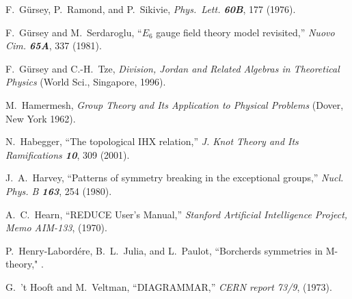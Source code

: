 F.~G{\"u}rsey, P.~Ramond, and P.~Sikivie,
{\em Phys.~Lett.  \bf 60B}, 177 (1976).

F.~G{\"u}rsey and M.~Serdaroglu,
``$E_6$ gauge field theory model revisited,''
{\em Nuovo Cim.    \bf 65A}, 337 (1981).

 F.~G{\"u}rsey and C.-H.~Tze,
    {\em Division, Jordan and Related Algebras in Theoretical Physics}
    (World Sci., Singapore, 1996).



 M.~Hamermesh,
{\em Group Theory and Its Application to Physical Problems}
(Dover, New York 1962).

 N.~Habegger,
    ``The topological IHX relation,''
    {\em J. Knot Theory and Its Ramifications  \bf 10}, 309 (2001). %


%
%

 J.~A.~Harvey,
``Patterns of symmetry breaking in the  exceptional groups,''
{\em Nucl. Phys. B \bf 163}, 254 (1980).


 A.~C.~Hearn,
``REDUCE User's Manual,''
{\em Stanford Artificial Intelligence Project, Memo AIM-133}, (1970).

   P.~Henry-Labord\'ere, B.~L.~Julia, and L.~Paulot,
     ``Borcherds symmetries in M-theory,"
.

%
 G.~'t Hooft and M.~Veltman,
``DIAGRAMMAR,''
{\em CERN report 73/9}, (1973).


